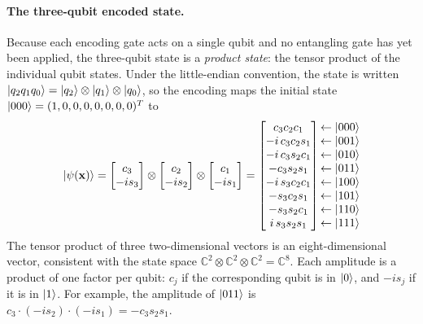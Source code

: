 \documentclass[12pt]{article}
\numberwithin{equation}{section}  %
\begin{document}
\paragraph{The three-qubit encoded state.} Because each encoding gate acts on a single qubit and no entangling gate has yet been applied, the three-qubit state is a \emph{product state}: the tensor product of the individual qubit states. Under the little-endian convention, the state is written $\ket{q_2 q_1 q_0} = \ket{q_2} \otimes \ket{q_1} \otimes \ket{q_0}$, so the encoding maps the initial state $\ket{000} = (1, 0, 0, 0, 0, 0, 0, 0)^{T}$ to
\begin{equation}
\ket{\psi(\mathbf{x})}
= \begin{bmatrix} c_3 \\ -is_3 \end{bmatrix} \otimes \begin{bmatrix} c_2 \\ -is_2 \end{bmatrix} \otimes \begin{bmatrix} c_1 \\ -is_1 \end{bmatrix}
= \begin{bmatrix}
c_3 c_2 c_1 \\ -i\, c_3 c_2 s_1 \\ -i\, c_3 s_2 c_1 \\ -c_3 s_2 s_1 \\ -i\, s_3 c_2 c_1 \\ -s_3 c_2 s_1 \\ -s_3 s_2 c_1 \\ i\, s_3 s_2 s_1
\end{bmatrix}
\begin{matrix}
\leftarrow \ket{000} \\ \leftarrow \ket{001} \\ \leftarrow \ket{010} \\ \leftarrow \ket{011} \\ \leftarrow \ket{100} \\ \leftarrow \ket{101} \\ \leftarrow \ket{110} \\ \leftarrow \ket{111}
\end{matrix}
\label{eq:encoded_state}
\end{equation}
The tensor product of three two-dimensional vectors is an eight-dimensional vector, consistent with the state space $\mathbb{C}^2 \otimes \mathbb{C}^2 \otimes \mathbb{C}^2 = \mathbb{C}^8$. Each amplitude is a product of one factor per qubit: $c_j$ if the corresponding qubit is in $\ket{0}$, and $-is_j$ if it is in $\ket{1}$. For example, the amplitude of $\ket{011}$ is $c_3 \cdot (-is_2) \cdot (-is_1) = -c_3 s_2 s_1$.
\end{document}
